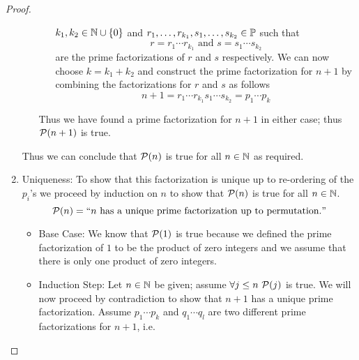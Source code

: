 \begin{proof}
\begin{enumerate}
\begin{itemize}
\begin{itemize}
                                    $k_1, k_2 \in \mathbb{N} \cup \left\{0\right\}$ and
                                    $r_1, \dots, r_{k_1}, s_1, \dots, s_{k_2} \in \mathbb{P}$ such that
                                    \[
                                        r = r_1 \cdots r_{k_1} \mbox{ and } s = s_1 \cdots s_{k_2}
                                    \]
                                    are the prime factorizations of $r$ and $s$ respectively. We can now choose
                                    $k = k_1 + k_2$ and construct the prime factorization for $n + 1$
                                    by combining the factorizations for $r$ and $s$ as follows
                                    \[
                                        n + 1 = r_1 \cdots r_{k_1} s_1 \cdots s_{k_2} = p_1 \cdots p_{k}
                                    \]
                            \end{itemize}
                            Thus we have found a prime factorization for $n + 1$ in either case;
                            thus $\mathcal{P}(n + 1)$ is true.
                    \end{itemize}
                    Thus we can conclude that $\mathcal{P}(n)$ is true for all $n \in \mathbb{N}$
                    as required.
                \item
                    Uniqueness: To show that this factorization is unique up to re-ordering
                    of the $p_i$'s we proceed by induction on $n$ to show that $\mathcal{P}(n)$
                    is true for all $n \in \mathbb{N}$.
                    \[
                        \mathcal{P}(n) = ``n \mbox{ has a unique prime factorization up to permutation}."
                    \]
                    \begin{itemize}
                        \item
                            Base Case: We know that $\mathcal{P}(1)$ is true because we defined
                            the prime factorization of $1$ to be the product of zero integers and
                            we assume that there is only one product of zero integers.
                        \item
                            Induction Step: Let $n \in \mathbb{N}$ be given; assume $\forall j \le n \
                            \mathcal{P}(j)$ is true. We will now proceed by contradiction
                            to show that $n + 1$ has a unique prime factorization. Assume $p_1 \cdots p_k$ and
                            $q_1 \cdots q_l$ are two different prime factorizations for $n + 1$, i.e.

\end{itemize}
\end{enumerate}
\end{proof}
